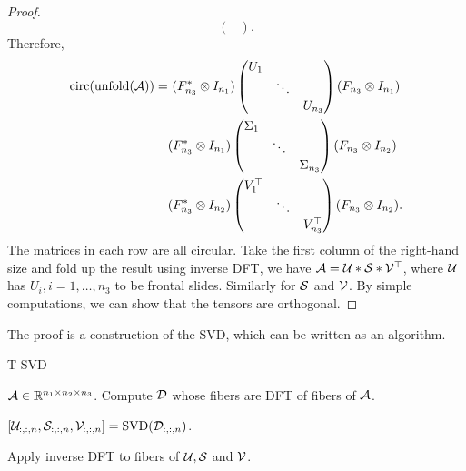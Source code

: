 \begin{proof}
$$\begin{pmatrix}
        \end{pmatrix}.$$
    Therefore,
    \begin{align*}
        \mathrm{circ}(\mathrm{unfold}(\A))
        = & \,\, (F^*_{n_3}\otimes I_{n_1})
        \begin{pmatrix}
            U_1 &        &         \\
                & \ddots &         \\
                &        & U_{n_3} \\
        \end{pmatrix}  (F_{n_3}\otimes I_{n_1}) \\
          & (F^*_{n_3}\otimes I_{n_1})
        \begin{pmatrix}
            \Sigma_1 &        &              \\
                     & \ddots &              \\
                     &        & \Sigma_{n_3} \\
        \end{pmatrix} (F_{n_3}\otimes I_{n_2})  \\
          & (F^*_{n_3}\otimes I_{n_2})
        \begin{pmatrix}
            V_1^\top &        &              \\
                     & \ddots &              \\
                     &        & V_{n_3}^\top \\
        \end{pmatrix}(F_{n_3}\otimes I_{n_2}).
    \end{align*}
    The matrices in each row are all circular. Take the first column of the right-hand size and fold up the result using inverse DFT, we have $\A = \U*\S*\V^\top$, where $\U$ has $U_i, i = 1,\ldots,n_3$ to be frontal slides. Similarly for $\S$ and $\V$. By simple computations, we can show that the tensors are orthogonal.
\end{proof}

The proof is a construction of the SVD, which can be written as an algorithm.

\begin{algorithm}
    \caption{T-SVD}
    \label{alg:cap}
    \begin{algorithmic}
        \Require $\A\in\RR^{n_1\times n_2\times n_3}$.
        \State Compute $\D$ whose fibers are DFT of fibers of $\A$.

        \State $[\U_{:,:,n}, \S_{:,:,n}, \V_{:,:,n}] = \mathrm{SVD}(\D_{:,:,n})$.
        \EndFor

        \State Apply inverse DFT to fibers of $\U, \S$ and $\V$.
    \end{algorithmic}
\end{algorithm}

